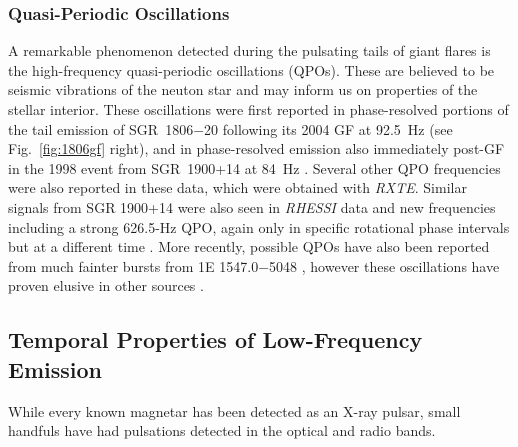 \subsubsection{Quasi-Periodic Oscillations}
\label{sec:qpos}

A remarkable phenomenon detected during the pulsating tails of giant flares is the high-frequency
quasi-periodic oscillations (QPOs).
These are believed to be seismic vibrations
of the neuton star and may inform us on properties of the stellar interior.  
These oscillations were first reported in phase-resolved portions of the tail emission of SGR~1806$-$20
following its 2004 GF \citep{ibs+05} at 92.5~Hz (see Fig.~\ref{fig:1806gf} right), 
and in phase-resolved emission also immediately post-GF in
the 1998 event from SGR~1900+14 at 84~Hz \citep{sw05}.  Several other QPO frequencies were also reported in these data,
which were obtained with {\it RXTE}.  Similar signals from SGR 1900+14 were also seen in {\it RHESSI} data
and new frequencies including a strong 626.5-Hz QPO, again only in specific rotational phase intervals but at a different time
\citep{ws06}.
More recently, possible QPOs have also been reported from much fainter bursts from 1E 1547.0$-$5048
\citep{hdw+14}, however these oscillations have proven elusive in other sources
\citep[e.g.][]{hwu+13}.  


\subsection{Temporal Properties of Low-Frequency Emission}
\label{sec:multitemporal}

While every known magnetar has been detected as an X-ray pulsar, small handfuls have had
pulsations detected in the optical and radio bands.

